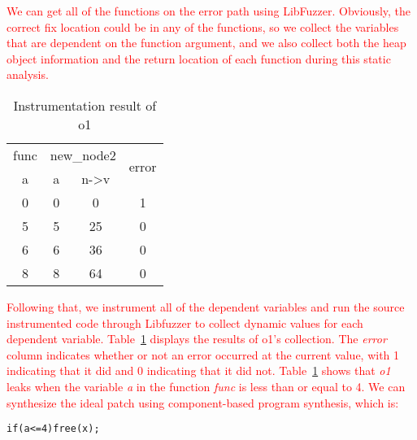 \documentclass[a4j,dvipdfmx]{article}
\begin{document}
\textcolor{red}{
We can get all of the functions on the error path using LibFuzzer. Obviously, the correct fix location could be in any of the functions, so we collect the variables that are dependent on the function argument, and we also collect both the heap object information and the return location of each function during this static analysis. }

\begin{table}[h]
  \caption{Instrumentation result of o1}
  \label{instres}
  \centering
  \begin{tabular}{|c|c|c|c|}
    \hline
    func  & \multicolumn{2}{|c|}{new\_node2} & \multirow{2}{*}{error} \\
    \cline{1-3}
    a & a & n->v &\\
    \hline
     0 & 0  & 0 & 1\\
     5 & 5  & 25 & 0\\
     6 & 6  & 36 & 0\\
     8 & 8  & 64 & 0\\
    \hline
  \end{tabular}
\end{table}

\textcolor{red}{
Following that, we instrument all of the dependent variables and run the source instrumented code through Libfuzzer to collect dynamic values for each dependent variable. Table~\ref{instres} displays the results of o1's collection. The {\it error} column indicates whether or not an error occurred at the current value, with 1 indicating that it did and 0 indicating that it did not. Table~\ref{instres} shows that {\it o1} leaks when the variable {\it a} in the function {\it func} is less than or equal to 4. We can synthesize the ideal patch using component-based program synthesis\cite{oracle}, which is:
}
\begin{minipage}{\textwidth}
\vspace{0.2cm}
\hspace{0.3cm}
\raggedright
\verb|if(a<=4)free(x);|
\label{patch1}
\vspace{0.2cm}
\end{minipage}
\end{document}
